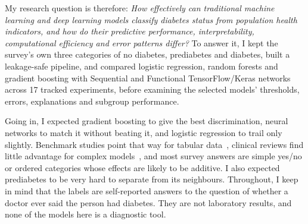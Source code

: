 My research question is therefore: \emph{How effectively can traditional machine learning and deep learning models classify diabetes status from population health indicators, and how do their predictive performance, interpretability, computational efficiency and error patterns differ?} To answer it, I kept the survey's own three categories of no diabetes, prediabetes and diabetes, built a leakage-safe pipeline, and compared logistic regression, random forests and gradient boosting with Sequential and Functional TensorFlow/Keras networks across 17 tracked experiments, before examining the selected models' thresholds, errors, explanations and subgroup performance.

Going in, I expected gradient boosting to give the best discrimination, neural networks to match it without beating it, and logistic regression to trail only slightly. Benchmark studies point that way for tabular data~\cite{grinsztajn2022,shwartzziv2022}, clinical reviews find little advantage for complex models~\cite{christodoulou2019}, and most survey answers are simple yes/no or ordered categories whose effects are likely to be additive. I also expected prediabetes to be very hard to separate from its neighbours. Throughout, I keep in mind that the labels are self-reported answers to the question of whether a doctor ever said the person had diabetes. They are not laboratory results, and none of the models here is a diagnostic tool.
